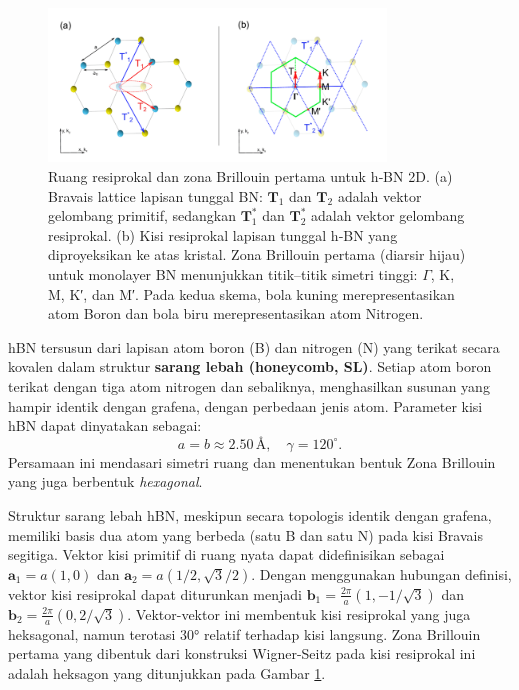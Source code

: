 \begin{figure}[ht]
    \centering
    \includegraphics[width=0.8\textwidth]{gambar/hBN_structure_brillouinzone}
    \caption{Ruang resiprokal dan zona Brillouin pertama untuk h‑BN 2D.
(a) Bravais lattice lapisan tunggal BN: $\mathbf{T}_1$ dan $\mathbf{T}_2$ adalah vektor gelombang primitif, sedangkan $\mathbf{T}_1^*$ dan $\mathbf{T}_2^*$ adalah vektor gelombang resiprokal.
(b) Kisi resiprokal lapisan tunggal h‑BN yang diproyeksikan ke atas kristal.
Zona Brillouin pertama (diarsir hijau) untuk monolayer BN menunjukkan titik–titik simetri tinggi: $\Gamma$, K, M, K′, dan M′.
Pada kedua skema, bola kuning merepresentasikan atom Boron dan bola biru merepresentasikan atom Nitrogen.
\citep{elias2020}}
    \label{fig:reciprocal_bz_hbn}
\end{figure}

hBN tersusun dari lapisan atom boron (B) dan nitrogen (N) yang terikat secara kovalen dalam struktur \textbf{sarang lebah (honeycomb, SL)}. Setiap atom boron terikat dengan tiga atom nitrogen dan sebaliknya, menghasilkan susunan yang hampir identik dengan grafena, dengan perbedaan jenis atom. Parameter kisi hBN dapat dinyatakan sebagai:
\[
a = b \approx 2.50 \, \text{\AA}, \quad \gamma = 120^\circ.
\]
Persamaan ini mendasari simetri ruang dan menentukan bentuk Zona Brillouin yang juga berbentuk \emph{hexagonal}.

Struktur sarang lebah hBN, meskipun secara topologis identik dengan grafena, memiliki basis dua atom yang berbeda (satu B dan satu N) pada kisi Bravais segitiga. Vektor kisi primitif di ruang nyata dapat didefinisikan sebagai $\mathbf{a}_1 = a(1, 0)$ dan $\mathbf{a}_2 = a(1/2, \sqrt{3}/2)$. Dengan menggunakan hubungan definisi, vektor kisi resiprokal dapat diturunkan menjadi $\mathbf{b}_1 = \frac{2\pi}{a}(1, -1/\sqrt{3})$ dan $\mathbf{b}_2 = \frac{2\pi}{a}(0, 2/\sqrt{3})$. Vektor-vektor ini membentuk kisi resiprokal yang juga heksagonal, namun terotasi 30° relatif terhadap kisi langsung. Zona Brillouin pertama yang dibentuk dari konstruksi Wigner-Seitz pada kisi resiprokal ini adalah heksagon yang ditunjukkan pada Gambar \ref{fig:reciprocal_bz_hbn}.


